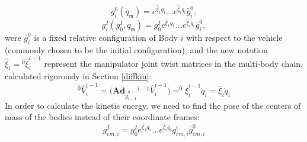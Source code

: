\documentclass[lettersize,journal]{IEEEtran}
\def \Ad {\textbf{Ad}}
\begin{document}
\begin{equation}
    g^0_i(q_\mathfrak{m})=e^{\hat{\xi}_{1}q_{1}}...e^{\hat{\xi}_{i}q_{i}}\bar{g}^0_{i},
\end{equation}
\begin{equation}
    g^I_i(g^I_0, q_\mathfrak{m})=g^I_0e^{\hat{\xi}_{1}q_{1}}...e^{\hat{\xi}_{i}q_{i}}\bar{g}^0_{i},
\end{equation}
were $\bar{g}^0_i$ is a fixed relative configuration of Body $i$ with respect to the vehicle (commonly chosen to be the initial configuration), and the new notation $\hat{\xi}_i={}^{\bar{0}}\hat{\xi}^{i-1}_i$ represent the manipulator joint twist matrices in the multi-body chain, calculated rigorously in Section \ref{diffkin}:
\begin{equation}
    ^{\bar{0}}\hat{V}^{i-1}_i=\big(\Ad_{\bar{g}^0_{i-1}}{}^{i-1}\hat{V}_{i}^{i-1}\big)=^{\bar{0}}\hat{\xi}^{i-1}_i\dot{q}_i=\hat{\xi}_i\dot{q}_i
    \label{twist}
\end{equation}
In order to calculate the kinetic energy, we need to find the pose of the centers of mass of the bodies instead of their coordinate frames:
\begin{equation}
    g^I_{cm,i}=g^I_0e^{\hat{\xi}_{1}q_{1}}...e^{\hat{\xi}_{i}q_{i}}g^i_{cm,i}\bar{g}^0_{cm,i}
\end{equation}
\end{document}
